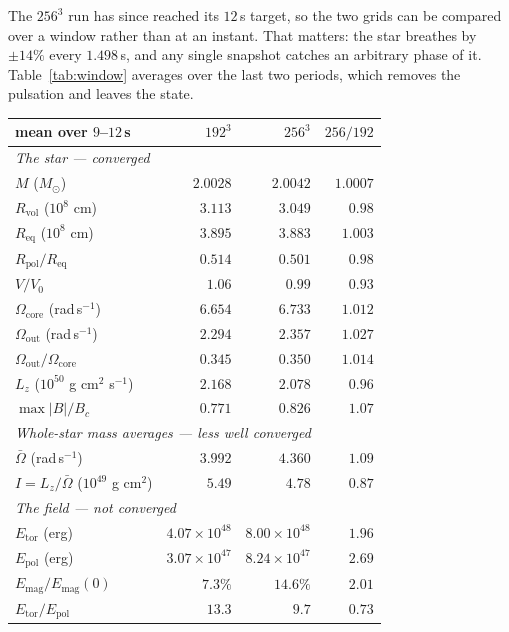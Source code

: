 \documentclass[11pt,a4paper]{article}
\newcommand{\Msun}{M_\odot}
\newcommand{\Req}{R_{\mathrm{eq}}}
\newcommand{\Rpol}{R_{\mathrm{pol}}}
\newcommand{\Rvol}{R_{\mathrm{vol}}}
\newcommand{\Etor}{E_{\mathrm{tor}}}
\newcommand{\Epol}{E_{\mathrm{pol}}}
\newcommand{\Emag}{E_{\mathrm{mag}}}
\begin{document}
The $256^3$ run has since reached its $12$\,s target, so the two grids can be
compared over a window rather than at an instant. That matters: the star
breathes by $\pm14\%$ every $1.498$\,s, and any single snapshot catches an
arbitrary phase of it. Table~\ref{tab:window} averages over the last two
periods, which removes the pulsation and leaves the state.

\begin{table}[h]
\centering\small
\begin{tabular}{lrrr}
\toprule
mean over $9$--$12$\,s & $192^3$ & $256^3$ & $256/192$ \\
\midrule
\multicolumn{4}{l}{\emph{The star --- converged}}\\
$M$ ($\Msun$) & $2.0028$ & $2.0042$ & $1.0007$ \\
$\Rvol$ ($10^8$ cm) & $3.113$ & $3.049$ & $0.98$ \\
$\Req$ ($10^8$ cm) & $3.895$ & $3.883$ & $\mathbf{1.003}$ \\
$\Rpol/\Req$ & $0.514$ & $0.501$ & $0.98$ \\
$V/V_0$ & $1.06$ & $0.99$ & $0.93$ \\
$\Omega_{\mathrm{core}}$ (rad\,s$^{-1}$) & $6.654$ & $6.733$ & $\mathbf{1.012}$ \\
$\Omega_{\mathrm{out}}$ (rad\,s$^{-1}$) & $2.294$ & $2.357$ & $\mathbf{1.027}$ \\
$\Omega_{\mathrm{out}}/\Omega_{\mathrm{core}}$ & $0.345$ & $0.350$ & $\mathbf{1.014}$ \\
$L_z$ ($10^{50}$ g cm$^2$ s$^{-1}$) & $2.168$ & $2.078$ & $0.96$ \\
$\max|B|/B_c$ & $0.771$ & $0.826$ & $1.07$ \\
\midrule
\multicolumn{4}{l}{\emph{Whole-star mass averages --- less well converged}}\\
$\bar\Omega$ (rad\,s$^{-1}$) & $3.992$ & $4.360$ & $1.09$ \\
$I = L_z/\bar\Omega$ ($10^{49}$ g cm$^2$) & $5.49$ & $4.78$ & $0.87$ \\
\midrule
\multicolumn{4}{l}{\emph{The field --- not converged}}\\
$\Etor$ (erg) & $4.07\times10^{48}$ & $8.00\times10^{48}$ & $\mathbf{1.96}$ \\
$\Epol$ (erg) & $3.07\times10^{47}$ & $8.24\times10^{47}$ & $\mathbf{2.69}$ \\
$\Emag/\Emag(0)$ & $7.3\%$ & $14.6\%$ & $2.01$ \\
$\Etor/\Epol$ & $13.3$ & $9.7$ & $0.73$ \\

\end{tabular}
\end{table}
\end{document}
